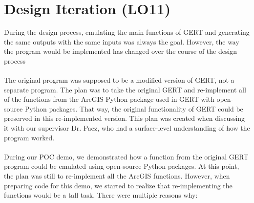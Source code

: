 \documentclass{article}
\begin{document}
\section{Design Iteration (LO11)}

During the design process, emulating the main functions of GERT and generating the same outputs with the same inputs was always the goal. However, the way the program would be implemented has changed over the course of the design process
\\ \\
The original program was supposed to be a modified version of GERT, not a separate program. The plan was to take the original GERT and re-implement all of the functions from the ArcGIS Python package used in GERT with open-source Python packages. That way, the original functionality of GERT could be preserved in this re-implemented version. This plan was created when discussing it with our supervisor Dr. Paez, who had a surface-level understanding of how the program worked.
\\ \\
During our POC demo, we demonstrated how a function from the original GERT program could be emulated using open-source Python packages. At this point, the plan was still to re-implement all the ArcGIS functions. However, when preparing code for this demo, we started to realize that re-implementing the functions would be a tall task. There were multiple reasons why: 
\end{document}
